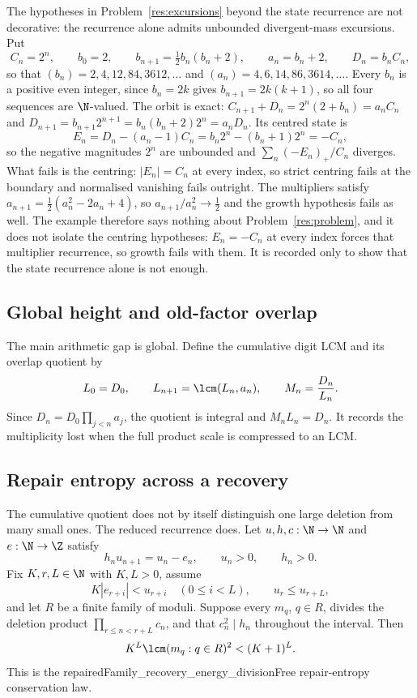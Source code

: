\documentclass[11pt]{article}
\begin{document}
\begin{remark}
The hypotheses in Problem~\ref{res:excursions} beyond the state recurrence are
not decorative: the recurrence alone admits unbounded divergent-mass
excursions.  Put
\[
 C_n=2^{n},\qquad b_0=2,\qquad b_{n+1}=\tfrac12 b_n(b_n+2),\qquad
 a_n=b_n+2,\qquad D_n=b_nC_n ,
\]
so that $(b_n)=2,4,12,84,3612,\ldots$ and $(a_n)=4,6,14,86,3614,\ldots$.  Every
$b_n$ is a positive even integer, since $b_n=2k$ gives $b_{n+1}=2k(k+1)$, so all
four sequences are $\N$-valued.  The orbit is exact:
$C_{n+1}+D_n=2^{n}(2+b_n)=a_nC_n$ and
$D_{n+1}=b_{n+1}2^{n+1}=b_n(b_n+2)2^{n}=a_nD_n$.  Its centred state is
\[
 E_n=D_n-(a_n-1)C_n=b_n2^{n}-(b_n+1)2^{n}=-C_n ,
\]
so the negative magnitudes $2^{n}$ are unbounded and $\sum_n(-E_n)_+/C_n$
diverges.  What fails is the centring: $|E_n|=C_n$ at every index, so strict
centring fails at the boundary and normalised vanishing fails outright.  The
multipliers satisfy $a_{n+1}=\tfrac12(a_n^{2}-2a_n+4)$, so
$a_{n+1}/a_n^{2}\to\tfrac12$ and the growth hypothesis fails as well.  The
example therefore says nothing about Problem~\ref{res:problem}, and it does not
isolate the centring hypotheses: $E_n=-C_n$ at every index forces that
multiplier recurrence, so growth fails with them.  It is recorded only to show
that the state recurrence alone is not enough.
\end{remark}

\subsection{Global height and old-factor overlap}

The main arithmetic gap is global.  Define the cumulative digit LCM and its
overlap quotient by
\[
 L_0=D_0,\qquad L_{n+1}=\lcm(L_n,a_n),\qquad M_n=\frac{D_n}{L_n}.
\]
Since $D_n=D_0\prod_{j<n}a_j$, the quotient is integral and
$M_nL_n=D_n$.  It records the multiplicity lost when the full product scale
is compressed to an LCM.

\subsection{Repair entropy across a recovery}

The cumulative quotient does not by itself distinguish one large deletion
from many small ones.  The reduced recurrence does.  Let $u,h,c:\N\to\N$ and
$e:\N\to\Z$ satisfy
\[
 h_nu_{n+1}=u_n-e_n,
 \qquad u_n>0,
 \qquad h_n>0.
\]
Fix $K,r,L\in\N$ with $K,L>0$, assume
\[
 K|e_{r+i}|<u_{r+i}\quad(0\le i<L),
 \qquad u_r\le u_{r+L},
\]
and let $R$ be a finite family of moduli.  Suppose every $m_q$, $q\in R$,
divides the deletion product $\prod_{r\le n<r+L}c_n$, and that
$c_n^2\mid h_n$ throughout the interval.  Then
\begin{equation}\label{eq:repair-entropy}
 K^L\lcm(m_q:q\in R)^2<(K+1)^L.
\end{equation}
This is the
      {repairedFamily_recovery_energy_divisionFree}
      {repair-entropy conservation law}.
\end{document}
